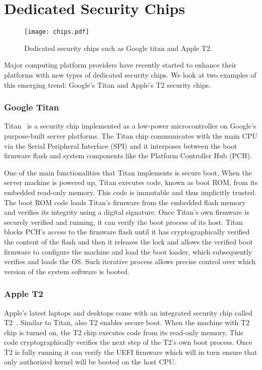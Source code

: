 \section*{Dedicated Security Chips}

\begin{figure}[t]
	\centering
	\texttt{[image: chips.pdf]}
	\caption{Dedicated security chips such as Google titan and Apple T2.}
\label{fig:prototype}   
\end{figure}


Major computing platform providers have recently started to enhance their platforms with new types of dedicated security chips. We look at two examples of this emerging trend: Google’s Titan and Apple’s T2 security chips.

\subsubsection*{Google Titan}

Titan~\cite{titan} is a security chip implemented as a low-power microcontroller on Google’s purpose-built server platforms. The Titan chip communicates with the main CPU via the Serial Peripheral Interface (SPI) and it interposes between the boot firmware flash and system components like the Platform Controller Hub (PCH).

 One of the main functionalities that Titan implements is secure boot. When the server machine is powered up, Titan executes code, known as boot ROM, from its embedded read-only memory. This code is immutable and thus implicitly trusted. The boot ROM code loads Titan’s firmware from the embedded flash memory and verifies its integrity using a digital signature. Once Titan’s own firmware is securely verified and running, it can verify the boot process of its host. Titan blocks PCH’s access to the firmware flash until it has cryptographically verified the content of the flash and then it releases the lock and allows the verified boot firmware to configure the machine and load the boot loader, which subsequently verifies and loads the OS. Such iterative process allows precise control over which version of the system software is booted. 

 
 \subsubsection*{Apple T2}
 
 Apple’s latest laptops and desktops come with an integrated security chip called T2~\cite{t2}. Similar to Titan, also T2 enables secure boot. When the machine with T2 chip is turned on, the T2 chip executes code from its read-only memory. This code cryptographically verifies the next step of the T2’s own boot process. Once T2 is fully running it can verify the UEFI firmware which will in turn ensure that only authorized kernel will be booted on the host CPU.

